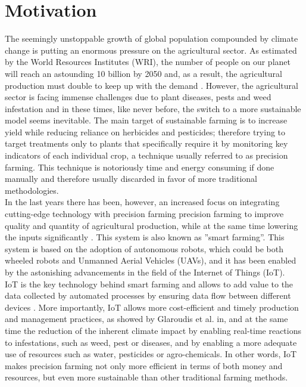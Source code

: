 \chapter{Motivation}
The seemingly unstoppable growth of global population compounded by climate change is putting an enormous pressure on the agricultural sector. As estimated by the World Resources Institutes (WRI), the number of people on our planet will reach an astounding 10 billion by 2050  \cite{ayaz_internet--things_2019} and, as a result, the agricultural production must double to keep up with the demand \cite{singh_machine_2016}. However, the agricultural sector is facing immense challenges due to plant diseases, pests and weed infestation and in these times, like never before, the switch to a more sustainable model seems inevitable. The main target of sustainable farming is to increase yield while reducing reliance on herbicides and pesticides; therefore trying to target treatments only to plants that specifically require it by monitoring key indicators of each individual crop, a technique usually referred to as precision farming. This technique is notoriously time and energy consuming if done manually and therefore usually discarded in favor of more traditional methodologies. \cite{lottes_effective_2016}\\
In the last years there has been, however, an increased focus on integrating cutting-edge technology with precision farming precision farming to improve quality and quantity of agricultural production, while at the same time lowering the inputs significantly \cite{islam_review_2021}.  This system is also known as ''smart farming''.  This system is based on the adoption of autonomous robots, which could be both wheeled robots and Unmanned Aerial Vehicles (UAVs), and it has been enabled by the astonishing advancements in the field of the Internet of Things (IoT). \\
IoT is the key technology behind smart farming and allows to add value to the data collected by automated processes by ensuring data flow between different devices  \cite{islam_review_2021}.  More importantly, IoT allows more cost-efficient and timely production and management practices, as showed by  Glaroudis et al. in\cite{glaroudis_survey_2020}, and at the same time the reduction of the inherent climate impact by enabling real-time reactions to infestations,  such as weed, pest or diseases, and by enabling a more adequate use of resources such as water, pesticides or agro-chemicals.\cite{islam_review_2021}
In other words, IoT makes precision farming not only more efficient in terms of both money and resources, but even more sustainable than other traditional farming methods. \\

